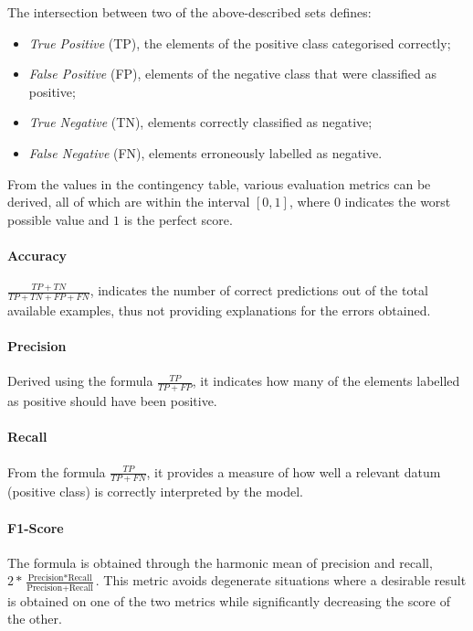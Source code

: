 The intersection between two of the above-described sets defines:
\begin{itemize}
    \item \emph{True Positive} (TP), the elements of the positive class categorised correctly;
    \item \emph{False Positive} (FP), elements of the negative class that were classified as positive;
    \item \emph{True Negative} (TN), elements correctly classified as negative;
    \item \emph{False Negative} (FN), elements erroneously labelled as negative.
\end{itemize}

From the values in the contingency table, various evaluation metrics can be derived, all of which are within the interval $[0, 1]$, where $0$ indicates the worst possible value and $1$ is the perfect score.

\paragraph{Accuracy} $\frac{TP + TN}{TP + TN + FP + FN}$, indicates the number of correct predictions out of the total available examples, thus not providing explanations for the errors obtained.

\paragraph{Precision} Derived using the formula $\frac{TP}{TP + FP}$, it indicates how many of the elements labelled as positive should have been positive.

\paragraph{Recall} From the formula $\frac{TP}{TP + FN}$, it provides a measure of how well a relevant datum (positive class) is correctly interpreted by the model.

\paragraph{F1-Score} The formula is obtained through the harmonic mean of precision and recall, $2*\frac{\text{Precision}*\text{Recall}}{\text{Precision}+\text{Recall}}$. This metric avoids degenerate situations where a desirable result is obtained on one of the two metrics while significantly decreasing the score of the other.

